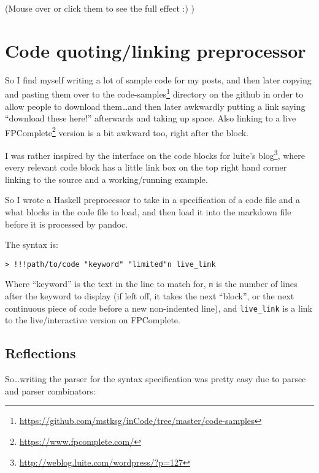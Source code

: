 \documentclass[]{article}
\renewcommand{\href}[2]{#2\footnote{\url{#1}}}
\begin{document}
(Mouse over or click them to see the full effect :) )

\section{Code quoting/linking preprocessor}\label{code-quotinglinking-preprocessor}

So I find myself writing a lot of sample code for my posts, and then later copying and pasting them
over to the \href{https://github.com/mstksg/inCode/tree/master/code-samples}{code-samples} directory
on the github in order to allow people to download them\ldots{}and then later awkwardly putting a
link saying ``download these here!'' afterwards and taking up space. Also linking to a live
\href{https://www.fpcomplete.com/}{FPComplete} version is a bit awkward too, right after the block.

I was rather inspired by the interface on the code blocks for
\href{http://weblog.luite.com/wordpress/?p=127}{luite's blog}, where every relevant code block has a
little link box on the top right hand corner linking to the source and a working/running example.

So I wrote a Haskell preprocessor to take in a specification of a code file and a what blocks in the
code file to load, and then load it into the markdown file before it is processed by pandoc.

The syntax is:

\begin{verbatim}
> !!!path/to/code "keyword" "limited"n live_link
\end{verbatim}

Where ``keyword'' is the text in the line to match for, \texttt{n} is the number of lines after the
keyword to display (if left off, it takes the next ``block'', or the next continuous piece of code
before a new non-indented line), and \texttt{live\_link} is a link to the live/interactive version
on FPComplete.

\subsection{Reflections}\label{reflections}

So\ldots{}writing the parser for the syntax specification was pretty easy due to parsec and parser
combinators:
\end{document}
